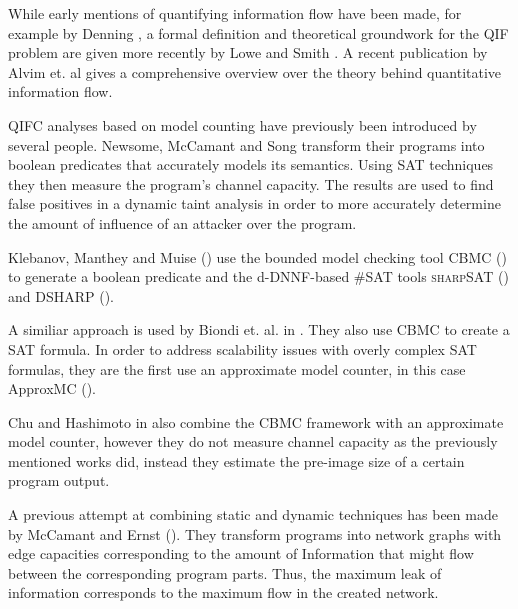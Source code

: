 While early mentions of quantifying information flow have been made, for example by Denning \cite{denning82}, a formal definition and theoretical groundwork for the QIF problem are given more recently by Lowe \cite{lowe02} and Smith \cite{smith09}. A recent publication by Alvim et. al \cite{alvim19} gives a comprehensive overview over the theory behind quantitative information flow.

QIFC analyses based on model counting have previously been introduced by several people.
Newsome, McCamant and Song \cite{newsome09} transform their programs into boolean predicates that accurately models its semantics. Using SAT techniques they then measure the program's channel capacity. The results are used to find false positives in a dynamic taint analysis in order to more accurately determine the amount of influence of an attacker over the program.

Klebanov, Manthey and Muise (\cite{klebanov13}) use the bounded model checking tool CBMC (\cite{cbmc}) to generate a boolean predicate and the d-DNNF-based \#SAT tools \textsc{sharp}SAT (\cite{thurley06}) and \textsc{DSHARP} (\cite{muise12}).

A similiar approach is used by Biondi et. al. in \cite{biondi18}. They also use CBMC to create a SAT formula. In order to address scalability issues with overly complex SAT formulas, they are the first use an approximate model counter, in this case ApproxMC (\cite{chakraborty13}).

Chu and Hashimoto in \cite{chu19} also combine the CBMC framework with an approximate model counter, however they do not measure channel capacity as the previously mentioned works did, instead they estimate the pre-image size of a certain program output.

A previous attempt at combining static and dynamic techniques has been made by McCamant and Ernst (\cite{mccamant08}). They transform programs into network graphs with edge capacities corresponding to the amount of Information that might flow between the corresponding program parts. Thus, the maximum leak of information corresponds to the maximum flow in the created network. 

